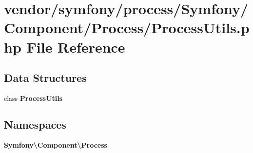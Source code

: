 \section{vendor/symfony/process/\+Symfony/\+Component/\+Process/\+Process\+Utils.php File Reference}
\label{_process_utils_8php}
\subsection*{Data Structures}
\begin{DoxyCompactItemize}
\item 
class {\bf Process\+Utils}
\end{DoxyCompactItemize}
\subsection*{Namespaces}
\begin{DoxyCompactItemize}
\item 
 {\bf Symfony\textbackslash{}\+Component\textbackslash{}\+Process}
\end{DoxyCompactItemize}

